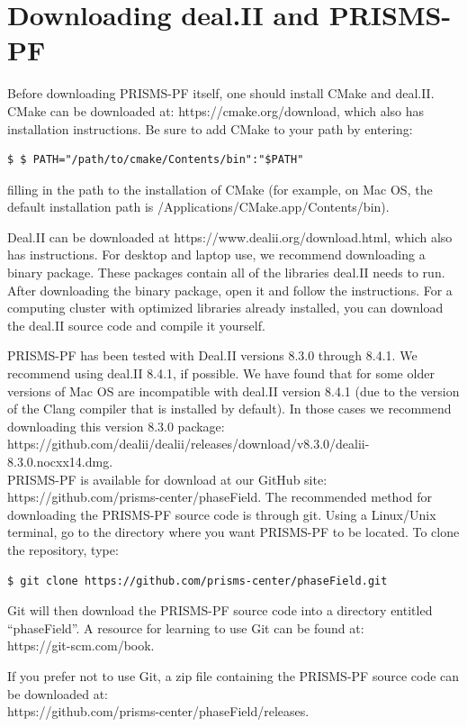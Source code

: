 \documentclass[10pt]{article} %
\begin{document}
\section{Downloading deal.II and PRISMS-PF}

Before downloading PRISMS-PF itself, one should install CMake and deal.II. CMake can be downloaded at: https://cmake.org/download, which also has installation instructions. Be sure to add CMake to your path by entering:
\begin{lstlisting}
$ $ PATH="/path/to/cmake/Contents/bin":"$PATH"
\end{lstlisting}
filling in the path to the installation of CMake (for example, on Mac OS, the default installation path is /Applications/CMake.app/Contents/bin).

Deal.II can be downloaded at https://www.dealii.org/download.html, which also has instructions. For desktop and laptop use, we recommend downloading a binary package. These packages contain all of the libraries deal.II needs to run. After downloading the binary package, open it and follow the instructions. For a computing cluster with optimized libraries already installed, you can download the deal.II source code and compile it yourself.

PRISMS-PF has been tested with Deal.II versions 8.3.0 through 8.4.1. We recommend using deal.II 8.4.1, if possible. We have found that for some older versions of Mac OS are incompatible with deal.II version 8.4.1 (due to the version of the Clang compiler that is installed by default). In those cases we recommend downloading this version 8.3.0 package:
\\ https://github.com/dealii/dealii/releases/download/v8.3.0/dealii-8.3.0.nocxx14.dmg.
 \\

PRISMS-PF is available for download at our GitHub site: https://github.com/prisms-center/phaseField. The recommended method for downloading the PRISMS-PF source code is through git. Using a Linux/Unix terminal, go to the directory where you want PRISMS-PF to be located. To clone the repository, type:
\begin{lstlisting}
$ git clone https://github.com/prisms-center/phaseField.git
\end{lstlisting}
Git will then download the PRISMS-PF source code into a directory entitled ``phaseField''. A resource for learning to use Git can be found at: \\https://git-scm.com/book.

If you prefer not to use Git, a zip file containing the PRISMS-PF source code can be downloaded at: \\https://github.com/prisms-center/phaseField/releases.
\end{document}
